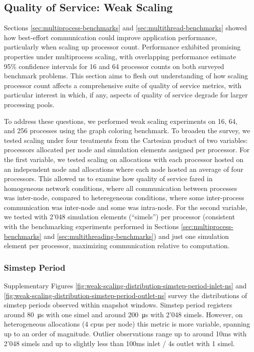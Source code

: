 \subsection{Quality of Service: Weak Scaling}

Sections \ref{sec:multiprocess-benchmarks} and \ref{sec:multithread-benchmarks} showed how best-effort communication could improve application performance, particularly when scaling up processor count.
Performance exhibited promising properties under multiprocess scaling, with overlapping performance estimate 95\% confidence intervals for 16 and 64 processor counts on both surveyed benchmark problems.
This section aims to flesh out understanding of how scaling processor count affects a comprehensive suite of quality of service metrics, with particular interest in which, if any, aspects of quality of service degrade for larger processing pools.

To address these questions, we performed weak scaling experiments on 16, 64, and 256 processes using the graph coloring benchmark.
To broaden the survey, we tested scaling under four treatments from the Cartesian product of two variables: processors allocated per node and simulation elements assigned per processor.
For the first variable, we tested scaling on allocations with each processor hosted on an independent node and allocations where each node hosted an average of four processors.
This allowed us to examine how quality of service fared in homogeneous network conditions, where all communication between processes was inter-node, compared to heteregeneous conditions, where some inter-process communication was inter-node and some was intra-node.
For the second variable, we tested with 2'048 simulation elements (``simels'') per processor (consistent with the benchmarking experiments performed in Sections \ref{sec:multiprocess-benchmarks} and \ref{sec:multithreading-benchmarks}) and just one simulation element per processor, maximizing communication relative to computation.

\subsubsection{Simstep Period}

Supplementary Figures \ref{fig:weak-scaling-distribution-simstep-period-inlet-ns} and \ref{fig:weak-scaling-distribution-simstep-period-outlet-ns} survey the distributions of simstep periods observed within snapshot windows.
Simstep period registers around \SI{80}{\micro\second} with one simel and around \SI{200}{\micro\second} with 2'048 simels.
However, on heterogeneous allocations (4 cpus per node) this metric is more variable, spanning up to an order of magnitude.
Outlier observations range up to around 10ms with 2'048 simels and up to slightly less than 100ms inlet / 4s outlet with 1 simel.

